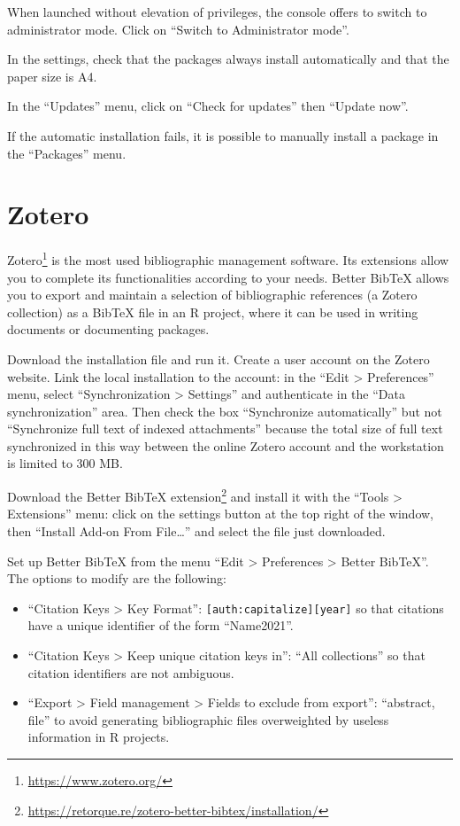 \documentclass[
  12pt,
  american,
  a4paper,
  extrafontsizes,onecolumn,openright
  ]{memoir}
\providecommand{\tightlist}{%
  \setlength{\itemsep}{0pt}\setlength{\parskip}{0pt}}
\begin{document}
When launched without elevation of privileges, the console offers to switch to administrator mode.
Click on \enquote{Switch to Administrator mode}.

In the settings, check that the packages always install automatically and that the paper size is A4.

In the \enquote{Updates} menu, click on \enquote{Check for updates} then \enquote{Update now}.

If the automatic installation fails, it is possible to manually install a package in the \enquote{Packages} menu.

\hypertarget{sec:Zotero}{%
\section{Zotero}\label{sec:Zotero}}

Zotero\footnote{\url{https://www.zotero.org/}} is the most used bibliographic management software.
Its extensions allow you to complete its functionalities according to your needs.
Better BibTeX allows you to export and maintain a selection of bibliographic references (a Zotero collection) as a BibTeX file in an R project, where it can be used in writing documents or documenting packages.

Download the installation file and run it.
Create a user account on the Zotero website.
Link the local installation to the account: in the \enquote{Edit \textgreater{} Preferences} menu, select \enquote{Synchronization \textgreater{} Settings} and authenticate in the \enquote{Data synchronization} area.
Then check the box \enquote{Synchronize automatically} but not \enquote{Synchronize full text of indexed attachments} because the total size of full text synchronized in this way between the online Zotero account and the workstation is limited to 300 MB.

Download the Better BibTeX extension\footnote{\url{https://retorque.re/zotero-better-bibtex/installation/}} and install it with the \enquote{Tools \textgreater{} Extensions} menu: click on the settings button at the top right of the window, then \enquote{Install Add-on From File\ldots{}} and select the file just downloaded.

Set up Better BibTeX from the menu \enquote{Edit \textgreater{} Preferences \textgreater{} Better BibTeX}.
The options to modify are the following:

\begin{itemize}
\tightlist
\item
  \enquote{Citation Keys \textgreater{} Key Format}: \texttt{{[}auth:capitalize{]}{[}year{]}} so that citations have a unique identifier of the form \enquote{Name2021}.
\item
  \enquote{Citation Keys \textgreater{} Keep unique citation keys in}: \enquote{All collections} so that citation identifiers are not ambiguous.
\item
  \enquote{Export \textgreater{} Field management \textgreater{} Fields to exclude from export}: \enquote{abstract, file} to avoid generating bibliographic files overweighted by useless information in R projects.
\end{itemize}
\end{document}

